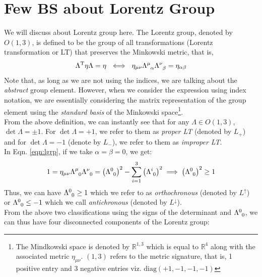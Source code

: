 \section{Few BS about Lorentz Group}\label{sec:appA}
We will discuss about Lorentz group here. The Lorentz group, denoted by $O(1,3)$, is defined to be the group of all transformations (Lorentz transformation or LT) that preserves the Minkowski metric, that is,
\begin{equation}\label{eqn:lgrp}
    \Lambda^\mathrm{T} \eta \Lambda = \eta\ \iff \ \eta_{\mu\nu}\trmat{\mu}{\alpha}\trmat{\nu}{\beta}=\eta_{\alpha\beta}
\end{equation}
Note that, as long as we are not using the indices, we are talking about the \textit{abstract} group element. However, when we consider the expression using index notation, we are essentially considering the matrix representation of the group element using the \textit{standard basis} of the Minkowski space\footnote{The Mindkowski space is denoted by $\mathbb{R}^{1,3}$ which is equal to $\mathbb{R}^4$ along with the associated metric $\eta_{\mu\nu}$. $(1,3)$ refers to the metric signature, that is, 1 positive entry and 3 negative entries viz. $\mathrm{diag}(+1,-1,-1,-1)$}.\\[0.2cm] From the above definition, we can instantly see that for any $\Lambda \in O(1,3)$, $\det\Lambda = \pm 1$. For $\det \Lambda =+1$, we refer to them as \textit{proper LT} (denoted by $L_{+}$) and for $\det \Lambda =-1$ (denote by $L_-$), we refer to them as \textit{improper LT}.\\
In Eqn. \ref{eqn:lgrp}, if we take $\alpha=\beta=0$, we get:
\begin{align*}
   1 =  \eta_{\mu\nu}\trmat{\mu}{0}\trmat{\nu}{0} =\qty( \trmat{0}{0})^2 - \sum\limits_{i=1}^3 \qty( \trmat{i}{0})^2 \implies \qty( \trmat{0}{0})^2 \geq 1
\end{align*}
Thus, we can have $\trmat{0}{0}\geq 1$ which we refer to as \textit{orthochronous} (denoted by $L^{\uparrow}$) or $\trmat{0}{0}\leq -1$ which we call \textit{antichronous} (denoted by $L^{\downarrow}$). \\[0.2cm]
From the above two classifications using the signs of the determinant and $\trmat{0}{0}$, we can thus have four disconnected components of the Lorentz group:
